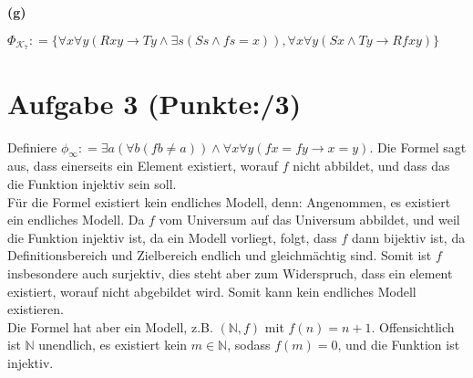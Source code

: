 \documentclass[11pt, a4paper]{article}
\newcommand{\pp}{3}
\newcommand{\defgr}{\mathrel{\mathop:\!\!=}}
\begin{document}
\textbf{(g)}
\begin{adjustwidth}{20pt}{20pt}
	$\Phi_{\mathcal{K}_7} \defgr \{ \forall x \forall y(Rxy \rightarrow Ty \wedge \exists s(Ss \wedge fs=x)), \forall x \forall y(Sx \wedge Ty \rightarrow Rfxy)\}$
\end{adjustwidth}




\section*{Aufgabe 3 (Punkte:\qquad/\pp)}
\begin{adjustwidth}{20pt}{20pt}
	Definiere $\phi_\infty \defgr \exists a(\forall b(fb \neq a)) \wedge \forall x \forall y(fx = fy \rightarrow x=y)$. Die Formel sagt aus, dass einerseits ein Element existiert, worauf
	$f$ nicht abbildet, und dass das die Funktion injektiv sein soll.\\
	Für die Formel existiert kein endliches Modell, denn: Angenommen, es existiert ein endliches Modell. Da $f$ vom Universum auf das Universum abbildet, und weil die Funktion injektiv ist,
	da ein Modell vorliegt, folgt, dass $f$ dann bijektiv ist, da Definitionsbereich und Zielbereich endlich und gleichmächtig sind. Somit ist $f$ insbesondere auch surjektiv, dies steht aber
	zum Widerspruch, dass ein element existiert, worauf nicht abgebildet wird. Somit kann kein endliches Modell existieren.\\
	Die Formel hat aber ein Modell, z.B. $(\mathbb{N},f)$ mit $f(n)=n+1$. Offensichtlich ist $\mathbb{N}$ unendlich, es existiert kein $m \in \mathbb{N}$, sodass $f(m)=0$, und die Funktion
	ist injektiv. 
	
\end{adjustwidth}
\end{document}
